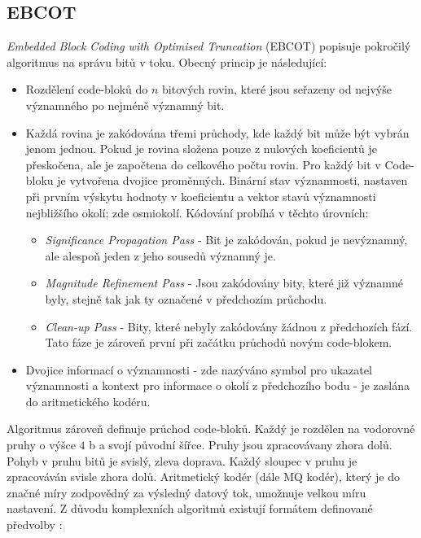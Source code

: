 \subsection*{EBCOT}
\textit{Embedded Block Coding with Optimised Truncation} (EBCOT) \cite{ebcot} popisuje pokročilý algoritmus na správu bitů v toku. 
Obecný princip je následující:
\begin{itemize}
  \item{Rozdělení code-bloků do $n$ bitových rovin, které jsou seřazeny od nejvýše významného po nejméně významný bit.}
  \item{Každá rovina je zakódována třemi průchody, kde každý bit může být vybrán jenom jednou. Pokud je rovina složena pouze z nulových koeficientů je přeskočena, ale je započtena do celkového počtu rovin. Pro každý bit v Code-bloku je vytvořena dvojice proměnných. Binární stav významnosti, nastaven při prvním výskytu hodnoty v koeficientu a vektor stavů významnosti nejbližšího okolí; zde osmiokolí. Kódování probíhá v těchto úrovních:}
  \begin{itemize}
    \item \textit{Significance Propagation Pass} - Bit je zakódován, pokud je nevýznamný, ale alespoň jeden z jeho sousedů významný je.
    \item \textit{Magnitude Refinement Pass} - Jsou zakódovány bity, které již významné byly, stejně tak jak ty označené v předchozím průchodu.
    \item \textit{Clean-up Pass} - Bity, které nebyly zakódovány žádnou z předchozích fází. Tato fáze je zároveň první při začátku průchodů novým code-blokem.
  \end{itemize}
  \item Dvojice informací o významnosti - zde nazýváno symbol pro ukazatel významnosti a kontext pro informace o okolí z předchozího bodu - je zaslána do aritmetického kodéru.
\end{itemize}
Algoritmus zároveň definuje průchod code-bloků. Každý je rozdělen na vodorovné pruhy o výšce $4$ b a svojí původní šířce. Pruhy jsou zpracovávany zhora dolů. Pohyb v pruhu bitů je svislý, zleva doprava. Každý sloupec v pruhu je zpracováván svisle zhora dolů. Aritmetický kodér (dále MQ kodér), který je do značné míry zodpovědný za výsledný datový tok, umožnuje velkou míru nastavení. Z důvodu komplexních algoritmů existují formátem definované předvolby \cite{kniha}:

